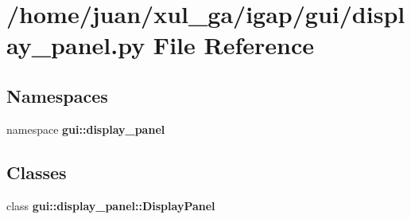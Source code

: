 \section{/home/juan/xul\_\-ga/igap/gui/display\_\-panel.py File Reference}
\label{display__panel_8py}
\subsection*{Namespaces}
\begin{CompactItemize}
\item 
namespace {\bf gui::display\_\-panel}
\end{CompactItemize}
\subsection*{Classes}
\begin{CompactItemize}
\item 
class {\bf gui::display\_\-panel::DisplayPanel}
\end{CompactItemize}
